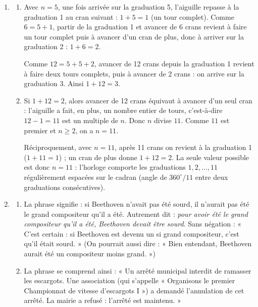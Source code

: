 \begin{enumerate}
\item
\begin{enumerate}
    \item Avec $n = 5$, une fois arrivée sur la graduation 5, l'aiguille repasse à la graduation 1 au cran suivant : $1 + 5 = 1$ (un tour complet). Comme $6 = 5 + 1$, partir de la graduation 1 et avancer de 6 crans revient à faire un tour complet puis à avancer d'un cran de plus, donc à arriver sur la graduation 2 : $1 + 6 = 2$.

    Comme $12 = 5 + 5 + 2$, avancer de 12 crans depuis la graduation 1 revient à faire deux tours complets, puis à avancer de 2 crans : on arrive sur la graduation 3. Ainsi $1 + 12 = 3$.

    \item Si $1 + 12 = 2$, alors avancer de 12 crans équivaut à avancer d'un seul cran : l'aiguille a fait, en plus, un nombre entier de tours, c'est-à-dire $12 - 1 = 11$ est un multiple de $n$. Donc $n$ divise $11$. Comme $11$ est premier et $n \geqslant 2$, on a $n = 11$.

    Réciproquement, avec $n = 11$, après 11 crans on revient à la graduation 1 ($1 + 11 = 1$) ; un cran de plus donne $1 + 12 = 2$. La seule valeur possible est donc $n = 11$ : l'horloge comporte les graduations $1, 2, \dots, 11$ régulièrement espacées sur le cadran (angle de $360^\circ/11$ entre deux graduations consécutives).
\end{enumerate}

\item
\begin{enumerate}
    \item La phrase signifie : si Beethoven n'avait pas été sourd, il n'aurait pas été le grand compositeur qu'il a été. Autrement dit : \emph{pour avoir été le grand compositeur qu'il a été, Beethoven devait être sourd}. Sans négation : « C'est certain : si Beethoven est devenu un si grand compositeur, c'est qu'il était sourd. » (On pourrait aussi dire : « Bien entendant, Beethoven aurait été un compositeur moins grand. »)

    \item La phrase se comprend ainsi : « Un arrêté municipal interdit de ramasser les escargots. Une association (qui s'appelle « Organisons le premier Championnat de vitesse d'escargots I ») a demandé l'annulation de cet arrêté. La mairie a refusé : l'arrêté est maintenu. »
\end{enumerate}


\end{enumerate}
